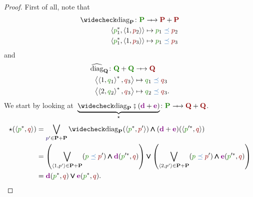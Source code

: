 \begin{proof}
    First of all, note that
    \begin{equation}
        \begin{aligned}
            \conj{\diag}_\posgenA\colon \funposA          & \profto \resposA+\resposA                \\
            \tup{\funposAel_1^*,\disunionA{\resposAel_2}} & \mapsto \funposAel_1\posleq \resposAel_2 \\
            \tup{\funposAel_1^*,\disunionA{\resposAel_3}} & \mapsto \funposAel_1\posleq \resposAel_3
        \end{aligned}
    \end{equation}
    and
    \begin{equation}
        \begin{aligned}
            \comp{\diag}_\posgenB\colon \funposB+\funposB & \profto \resposB                           \\
            \tup{\disunionA{\funposBel_1}^*,\resposBel_3} & \mapsto \funposBel_1\posleq \resposBel_3   \\
            \tup{\disunionB{\funposBel_2}^*,\resposBel_3} & \mapsto \funposBel_2 \posleq \resposBel_3.
        \end{aligned}
    \end{equation}
    We start by looking at~$\underbrace{\conj{\diag}_\posgenA\then (\adpa+\adpb)}_{\star}\colon \funposA \profto \resposB+\resposB$.
    \begin{equation}
        \begin{aligned}
            \star (\tup{\funposAel^*,\resposBel}) & =\bigvee_{\posAel'\in \posgenA+\posgenA} \conj{\diag}_\posgenA(\tupp{\funposAel^*,\resposAel'})\booland (\adpa+\adpb)(\tupp{\funposAel'^*,\resposBel})                                                                                                                                              \\
                                                  & =\left( \bigvee_{\disunionA{\posgenAel'}\in \posgenA+\posgenA} (\funposAel\posleq \resposAel')\booland \adpa(\funposAel'^*,\resposBel) \right)\boolor \left( \bigvee_{\disunionB{\posgenAel'}\in \posgenA+\posgenA} (\funposAel\posleq \resposAel')\booland \adpb(\funposAel'^*,\resposBel) \right) \\
                                                  & =\adpa(\funposAel^*,\resposBel) \boolor \adpb(\funposAel^*,\resposBel).
        \end{aligned}
    \end{equation}

\end{proof}
